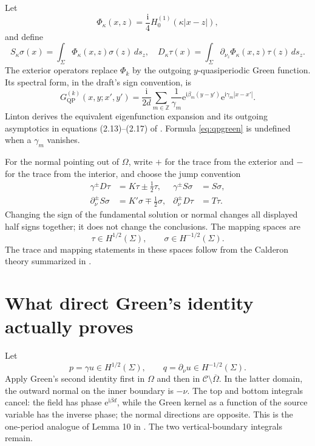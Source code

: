 \documentclass[11pt]{article}
\newcommand{\C}{\mathcal C}
\newcommand{\Om}{\Omega}
\newcommand{\Sig}{\Sigma}
\newcommand{\Z}{\mathbb Z}
\newcommand{\ii}{\mathrm i}
\newcommand{\ee}{\mathrm e}
\newcommand{\QP}{\mathrm{QP}}
\theoremstyle{plain}
\theoremstyle{definition}
\theoremstyle{remark}
\begin{document}
Let
\[
\Phi_\kappa(x,z)=\frac{\ii}{4}H_0^{(1)}(\kappa|x-z|),
\]
and define
\begin{equation}
S_\kappa\sigma(x)=\int_\Sig\Phi_\kappa(x,z)\sigma(z)\,ds_z,
\quad
D_\kappa\tau(x)=\int_\Sig\partial_{\nu_z}\Phi_\kappa(x,z)\tau(z)\,ds_z.
\label{eq:potentials}
\end{equation}
The exterior operators replace \(\Phi_k\) by the outgoing
\(y\)-quasiperiodic Green function.  Its spectral form, in the draft's sign
convention, is
\begin{equation}
G_{\QP}^{(k)}(x,y;x',y')
=\frac{\ii}{2d}\sum_{m\in\Z}\frac{1}{\gamma_m}
\ee^{\ii\beta_m(y-y')}\ee^{\ii\gamma_m|x-x'|}.
\label{eq:qpgreen}
\end{equation}
Linton derives the equivalent eigenfunction expansion and its outgoing
asymptotics in equations (2.13)--(2.17) of \cite{Linton1998}.  Formula
\eqref{eq:qpgreen} is undefined when a \(\gamma_m\) vanishes.

For the normal pointing out of \(\Om\), write \(+\) for the trace from the
exterior and \(-\) for the trace from the interior, and choose the jump
convention
\begin{align}
\gamma^\pm D\tau&=K\tau\pm\tfrac12\tau,
&\gamma^\pm S\sigma&=S\sigma,\label{eq:jumps1}\\
\partial_\nu^\pm S\sigma&=K'\sigma\mp\tfrac12\sigma,
&\partial_\nu^\pm D\tau&=T\tau.\label{eq:jumps2}
\end{align}
Changing the sign of the fundamental solution or normal changes all displayed
half signs together; it does not change the conclusions.  The mapping spaces
are
\[
\tau\in H^{1/2}(\Sig),\qquad \sigma\in H^{-1/2}(\Sig).
\]
The trace and mapping statements in these spaces follow from the Calderon
theory summarized in \cite[Sections 3--4]{DominguezLyonTurc2016}.

\section{What direct Green's identity actually proves}
\label{sec:green}

Let
\[
p=\gamma u\in H^{1/2}(\Sig),\qquad
q=\partial_\nu u\in H^{-1/2}(\Sig).
\]
Apply Green's second identity first in \(\Om\) and then in
\(\C\setminus\overline\Om\).  In the latter domain, the outward normal on the
inner boundary is \(-\nu\).  The top and bottom integrals cancel: the field has
phase \(\ee^{\ii\beta d}\), while the Green kernel as a function of the source
variable has the inverse phase; the normal directions are opposite.  This is
the one-period analogue of Lemma 10 in \cite[Appendix A]{BarnettGreengard2010}.
The two vertical-boundary integrals remain.
\end{document}
